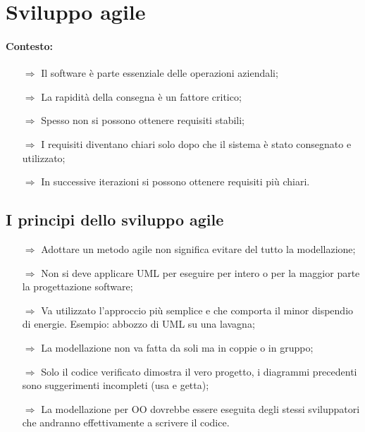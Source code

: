 
\section{Sviluppo agile}


\paragraph{Contesto:}

\begin{itemize}
    \item [$\Rightarrow$] Il software è parte essenziale delle operazioni aziendali;
    \item [$\Rightarrow$] La rapidità della consegna è un fattore critico;
    \item [$\Rightarrow$] Spesso non si possono ottenere requisiti stabili;
    \item [$\Rightarrow$] I requisiti diventano chiari solo dopo che il sistema
    è stato consegnato e utilizzato;
    \item [$\Rightarrow$] In successive iterazioni si possono ottenere requisiti
    più chiari.
\end{itemize}

\subsection{I principi dello sviluppo agile}


\begin{itemize}
    \item [$\Rightarrow$] Adottare un metodo agile non significa evitare del tutto
    la modellazione;
    \item [$\Rightarrow$] Non si deve applicare UML per eseguire per intero o per la maggior parte la
    progettazione software;
    \item [$\Rightarrow$] Va utilizzato l'approccio più semplice e che comporta il minor dispendio 
    di energie. Esempio: abbozzo di UML su una lavagna;
    \item [$\Rightarrow$] La modellazione non va fatta da soli ma in coppie o in gruppo;
    \item [$\Rightarrow$] Solo il codice verificato dimostra il vero progetto, i diagrammi precedenti
    sono suggerimenti incompleti (usa e getta);
    \item [$\Rightarrow$] La modellazione per OO dovrebbe essere eseguita degli stessi sviluppatori che andranno
    effettivamente a scrivere il codice. 
\end{itemize}

